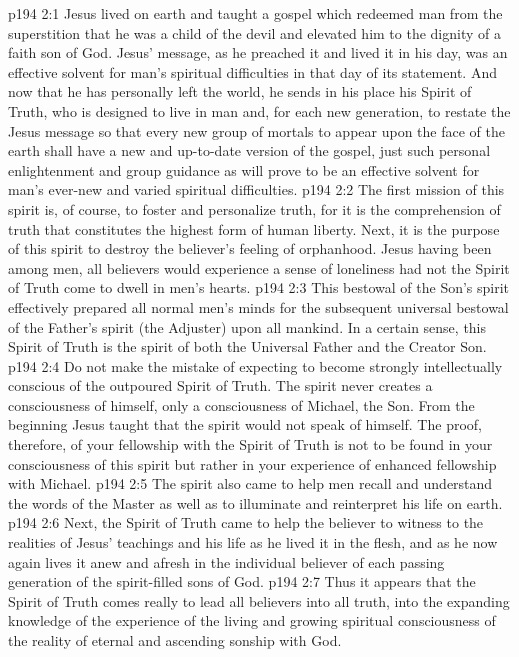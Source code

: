 \vs p194 2:1 Jesus lived on earth and taught a gospel which redeemed man from the superstition that he was a child of the devil and elevated him to the dignity of a faith son of God. Jesus’ message, as he preached it and lived it in his day, was an effective solvent for man’s spiritual difficulties in that day of its statement. And now that he has personally left the world, he sends in his place his Spirit of Truth, who is designed to live in man and, for each new generation, to restate the Jesus message so that every new group of mortals to appear upon the face of the earth shall have a new and up\hyp{}to\hyp{}date version of the gospel, just such personal enlightenment and group guidance as will prove to be an effective solvent for man’s ever\hyp{}new and varied spiritual difficulties.
\pc \vs p194 2:2 The first mission of this spirit is, of course, to foster and personalize truth, for it is the comprehension of truth that constitutes the highest form of human liberty. Next, it is the purpose of this spirit to destroy the believer’s feeling of orphanhood. Jesus having been among men, all believers would experience a sense of loneliness had not the Spirit of Truth come to dwell in men’s hearts.
\vs p194 2:3 This bestowal of the Son’s spirit effectively prepared all normal men’s minds for the subsequent universal bestowal of the Father’s spirit (the Adjuster) upon all mankind. In a certain sense, this Spirit of Truth is the spirit of both the Universal Father and the Creator Son.
\vs p194 2:4 Do not make the mistake of expecting to become strongly intellectually conscious of the outpoured Spirit of Truth. The spirit never creates a consciousness of himself, only a consciousness of Michael, the Son. From the beginning Jesus taught that the spirit would not speak of himself. The proof, therefore, of your fellowship with the Spirit of Truth is not to be found in your consciousness of this spirit but rather in your experience of enhanced fellowship with Michael.
\vs p194 2:5 The spirit also came to help men recall and understand the words of the Master as well as to illuminate and reinterpret his life on earth.
\vs p194 2:6 Next, the Spirit of Truth came to help the believer to witness to the realities of Jesus’ teachings and his life as he lived it in the flesh, and as he now again lives it anew and afresh in the individual believer of each passing generation of the spirit\hyp{}filled sons of God.
\vs p194 2:7 Thus it appears that the Spirit of Truth comes really to lead all believers into all truth, into the expanding knowledge of the experience of the living and growing spiritual consciousness of the reality of eternal and ascending sonship with God.\plusone
